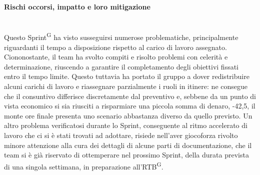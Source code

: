 \documentclass[8pt]{article}
\newcommand{\glossterm}[1]{#1\textsuperscript{G}} %
\newcommand{\subsubsubsection}[1]{\paragraph{#1}\mbox{}\\}
\begin{document}
\subsubsubsection{Rischi occorsi, impatto e loro mitigazione}
Questo \glossterm{Sprint} ha visto susseguirsi numerose problematiche, principalmente riguardanti
il tempo a disposizione rispetto al carico di lavoro assegnato. Ciononostante, il team ha svolto compiti e risolto problemi con celerità
e determinazione, riuscendo a garantire il completamento degli obiettivi fissati entro il tempo
limite. Questo tuttavia ha portato il gruppo a dover redistribuire alcuni carichi di lavoro e
riassegnare parzialmente i ruoli in itinere: ne consegue che il consuntivo differisce discretamente 
dal preventivo e, sebbene da un punto di vista economico si sia riusciti a risparmiare una piccola somma
di denaro, -42,5\texteuro, il monte ore finale presenta uno scenario abbastanza diverso da quello previsto.
Un altro problema verificatosi durante lo Sprint, conseguente al ritmo accelerato di lavoro che ci si è stati trovati ad adottare, 
risiede nell'aver giocoforza rivolto minore attenzione alla cura dei dettagli di alcune parti di documentazione, che il team 
si è già riservato di ottemperare nel prossimo Sprint, della durata prevista di una singola settimana, in preparazione all'\glossterm{RTB}.
\end{document}
